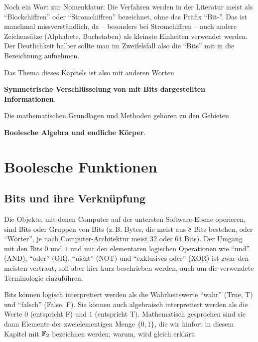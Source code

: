 \begin{refsegment}
Noch ein Wort zur Nomenklatur: Die Verfahren werden in der Literatur
meist als "`Blockchiffren"' oder
"`Stromchiffren"' bezeichnet, ohne
das Präfix "`Bit-"'. Das ist manchmal missverständlich, da -- besonders
bei Stromchiffren -- auch andere Zeichensätze (Alphabete, Buchstaben)
als kleinste Einheiten verwendet werden. Der Deutlichkeit halber
sollte man im Zweifelsfall also die "`Bits"' mit in die Bezeichnung
aufnehmen.

Das Thema dieses Kapitels ist also mit anderen Worten

   \textbf{Symmetrische Verschlüsselung von mit Bits dargestellten Informationen}.

\noindent Die mathematischen Grundlagen und Methoden gehören zu den Gebieten

   \textbf{Boolesche Algebra
   und endliche Körper}.


\newpage
\section{Boolesche Funktionen}\label{s-bool-fct}
\subsection{Bits und ihre Verknüpfung}\label{s-bool-bit}

Die Objekte, mit denen Computer auf der untersten Software-Ebene operieren,
sind Bits oder Gruppen von Bits (z.\,B. Bytes,
die meist aus 8 Bits bestehen,
oder "`Wörter"', je nach Computer-Architektur meist 32 oder 64 Bits).
Der Umgang mit den Bits $0$ und $1$ und mit den elementaren
logischen Operationen wie "`und"' (AND), "`oder"' (OR),
"`nicht"' (NOT) und "`exklusives oder"' (XOR) ist zwar den meisten
vertraut, soll aber hier kurz beschrieben werden, auch um die verwendete
Terminologie einzuführen.

Bits können logisch interpretiert werden als die
Wahrheitswerte "`wahr"'
(True, T) und "`falsch"' (False, F). Sie können auch algebraisch interpretiert
werden als die Werte $0$ (entspricht F) und $1$ (entspricht T). Mathematisch
gesprochen sind sie dann Elemente der zweielementigen Menge $\{0, 1\}$,
die wir hinfort in diesem Kapitel mit $\mathbb{F}_2$ bezeichnen werden; warum,
wird gleich erklärt:


\end{refsegment}
